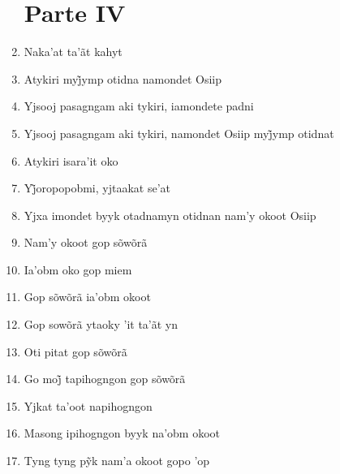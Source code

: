 \begin{enumerate}
 \section{Parte IV}

 \item Naka'at ta'ãt kahyt

 \item Atykiri myj̃ymp otidna namondet Osiip

 \item Yjsooj pasagngam aki tykiri, iamondete padni

 \item Yjsooj pasagngam aki tykiri, namondet Osiip myj̃ymp otidnat

 \item Atykiri isara'it oko

 \item Yj̃oropopobmi, yjtaakat se’at

 \begin{center}\end{center}

 \item Yjxa imondet byyk otadnamyn otidnan nam'y okoot Osiip

 \item Nam'y okoot gop sõwõrã

 \item Ia'obm oko gop miem

 \item Gop sõwõrã ia'obm okoot

 \begin{center}\end{center}

 \item Gop sowõrã ytaoky 'it ta'ãt yn

 \item Oti pitat gop sõwõrã

 \item Go moj̃ tapihogngon gop sõwõrã

 \item Yjkat ta'oot napihogngon

 \begin{center}\end{center}

 \item Masong ipihogngon byyk na'obm okoot

 \item Tyng tyng pỹk nam’a okoot gopo ’op


\end{enumerate}
